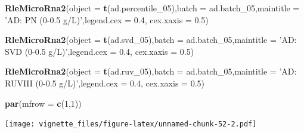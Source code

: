\documentclass[]{book}
\newenvironment{Shaded}{\begin{snugshade}}{\end{snugshade}}
\newcommand{\KeywordTok}[1]{\textcolor[rgb]{0.13,0.29,0.53}{\textbf{#1}}}
\newcommand{\DataTypeTok}[1]{\textcolor[rgb]{0.13,0.29,0.53}{#1}}
\newcommand{\DecValTok}[1]{\textcolor[rgb]{0.00,0.00,0.81}{#1}}
\newcommand{\FloatTok}[1]{\textcolor[rgb]{0.00,0.00,0.81}{#1}}
\newcommand{\StringTok}[1]{\textcolor[rgb]{0.31,0.60,0.02}{#1}}
\newcommand{\NormalTok}[1]{#1}
\begin{document}
\begin{Shaded}
\begin{Highlighting}[]
\KeywordTok{RleMicroRna2}\NormalTok{(}\DataTypeTok{object =} \KeywordTok{t}\NormalTok{(ad.percentile_}\DecValTok{05}\NormalTok{),}\DataTypeTok{batch =}\NormalTok{ ad.batch_}\DecValTok{05}\NormalTok{,}\DataTypeTok{maintitle =} \StringTok{'AD: PN (0-0.5 g/L)'}\NormalTok{,}\DataTypeTok{legend.cex =} \FloatTok{0.4}\NormalTok{, }\DataTypeTok{cex.xaxis =} \FloatTok{0.5}\NormalTok{)}

\KeywordTok{RleMicroRna2}\NormalTok{(}\DataTypeTok{object =} \KeywordTok{t}\NormalTok{(ad.svd_}\DecValTok{05}\NormalTok{),}\DataTypeTok{batch =}\NormalTok{ ad.batch_}\DecValTok{05}\NormalTok{,}\DataTypeTok{maintitle =} \StringTok{'AD: SVD (0-0.5 g/L)'}\NormalTok{,}\DataTypeTok{legend.cex =} \FloatTok{0.4}\NormalTok{, }\DataTypeTok{cex.xaxis =} \FloatTok{0.5}\NormalTok{)}

\KeywordTok{RleMicroRna2}\NormalTok{(}\DataTypeTok{object =} \KeywordTok{t}\NormalTok{(ad.ruv_}\DecValTok{05}\NormalTok{),}\DataTypeTok{batch =}\NormalTok{ ad.batch_}\DecValTok{05}\NormalTok{,}\DataTypeTok{maintitle =} \StringTok{'AD: RUVIII (0-0.5 g/L)'}\NormalTok{,}\DataTypeTok{legend.cex =} \FloatTok{0.4}\NormalTok{, }\DataTypeTok{cex.xaxis =} \FloatTok{0.5}\NormalTok{)}

\KeywordTok{par}\NormalTok{(}\DataTypeTok{mfrow =} \KeywordTok{c}\NormalTok{(}\DecValTok{1}\NormalTok{,}\DecValTok{1}\NormalTok{))}
\end{Highlighting}
\end{Shaded}

\texttt{[image: vignette\_files/figure-latex/unnamed-chunk-52-2.pdf]}
\end{document}
